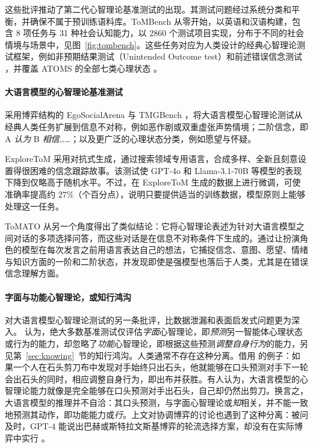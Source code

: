 这些批评推动了第二代心智理论基准测试的出现。其测试问题经过系统分类和平衡，并确保不属于预训练语料库。ToMBench 从零开始，以英语和汉语构建，包含 8 项任务与 31 种社会认知能力，以 2860 个测试项目实现，分布于不同的社会情境与场景中，见图~\ref{fig:tombench}。这些任务对应为人类设计的经典心智理论测试框架，例如非预期结果测试（Unintended Outcome test）\citep{dyck2001autism}和前述错误信念测试 \citep{wimmer1983beliefs}，并覆盖 ATOMS 的全部七类心理状态 \citep{beaudoin2020systematic}。

\paragraph{大语言模型的心智理论基准测试}
采用博弈结构的 EgoSocialArena \citep{hou2024entering} 与 TMGBench \citep{wang2024tmgbenchsystematicgamebenchmark}，将大语言模型心智理论测试从经典人类任务扩展到信息不对称，例如恶作剧或双重虚张声势情境；二阶信念，即 A \textit{认为} B \textit{相信}……；以及更广泛的心理状态分类，例如愿望与怀疑。

ExploreToM \citep{sclar2024explore} 采用对抗式生成，通过搜索领域专用语言，合成多样、全新且刻意设置得很困难的信念跟踪故事。该测试使 GPT-4o 和 Llama-3.1-70B 等模型的表现下降到仅略高于随机水平。不过，在 ExploreToM 生成的数据上进行微调，可使准确率提高约 $27$\%（个百分点），说明只要提供适当的训练数据，模型原则上能够处理这一任务。

ToMATO \citep{shinoda2025tomato} 从另一个角度得出了类似结论：它将心智理论表述为针对大语言模型之间对话的多项选择问答，而这些对话是在信息不对称条件下生成的。通过让扮演角色的模型在每次发言之前用语言表达自己的想法，它捕捉信念、意图、愿望、情绪与知识方面的一阶和二阶状态，并发现即使是强模型也落后于人类，尤其是在错误信念理解方面。

\paragraph{字面与功能心智理论，或知行鸿沟}
对大语言模型心智理论测试的另一条批评，比数据泄漏和表面启发式问题更为深入。\citet{riemer2024position} 认为，绝大多数基准测试仅评估\emph{字面}心智理论，即\emph{预测}另一智能体心理状态或行为的能力，却忽略了\emph{功能}心智理论，即根据这些预测\emph{调整自身行为}的能力，另见第~\ref{sec:knowing}~节的知行鸿沟。人类通常不存在这种分离。借用 \citet{riemer2024position} 的例子：如果一个人在石头剪刀布中发现对手始终只出石头，他就能够在口头预测对手下一轮会出石头的同时，相应调整自身行为，即出布并获胜。有人认为，大语言模型的心智理论能力就像是完全能够在口头预测对手出石头，自己却仍然出剪刀。换言之，大语言模型的推理并不自洽：其口头预测，与字面心智理论或{\em 知}相关，并不能一致地预测其动作，即功能能力或{\em 行}。上文对协调博弈的讨论也遇到了这种分离：被问及时，GPT-4 能说出巴赫或斯特拉文斯基博弈的轮流选择方案，却没有在实际博弈中实行 \citep{akata2025playing}。

